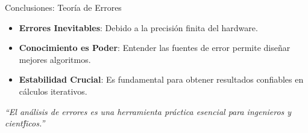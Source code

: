 \documentclass{beamer}
\begin{document}
\begin{frame}{Conclusiones: Teor\'ia de Errores}
    \begin{itemize}
      \item \textbf{Errores Inevitables}: Debido a la precisión finita del hardware.
      \item \textbf{Conocimiento es Poder}: Entender las fuentes de error permite diseñar mejores algoritmos.
      \item  \textbf{Estabilidad Crucial}: Es fundamental para obtener resultados confiables en cálculos iterativos.
    \end{itemize}
    \vspace{0.5cm}
    \begin{center}
      \it{``El análisis de errores es una herramienta práctica esencial para ingenieros y cient\'ficos.''}
    \end{center}
\end{frame}
\end{document}
